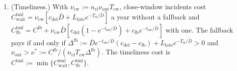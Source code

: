 \begin{proposition}
\begin{enumerate}
\item[(d)] (Timeliness.) With $\nu_{\mathrm{cw}}:=n_{\mathrm{cl}}\nu_{\mathrm{out}}T_{\mathrm{cw}}$, close-window incidents cost $C^{\mathrm{tml}}_{\mathrm{wait}}=\nu_{\mathrm{cw}}[c_{\mathrm{del}}\bar D+L_{\mathrm{late}}e^{-T_{\mathrm{sl}}/\bar D}]$ a year without a fallback and $C^{\mathrm{tml}}_{\mathrm{fb}}=C^{\mathrm{fb}}+\nu_{\mathrm{cw}}\bar D[c_{\mathrm{del}}(1-e^{-t_{\mathrm{sw}}/\bar D})+c_{\mathrm{fb}}e^{-t_{\mathrm{sw}}/\bar D}]$ with one. The fallback pays if and only if $\Delta^{\mathrm{fb}}:=\bar De^{-t_{\mathrm{sw}}/\bar D}(c_{\mathrm{del}}-c_{\mathrm{fb}})+L_{\mathrm{late}}e^{-T_{\mathrm{sl}}/\bar D}>0$ and $\nu_{\mathrm{out}}>\nu^*:=C^{\mathrm{fb}}/(n_{\mathrm{cl}}T_{\mathrm{cw}}\Delta^{\mathrm{fb}})$. The timeliness cost is $C^{\mathrm{tml}}:=\min\{C^{\mathrm{tml}}_{\mathrm{wait}},C^{\mathrm{tml}}_{\mathrm{fb}}\}$.
\end{enumerate}
\end{proposition}

